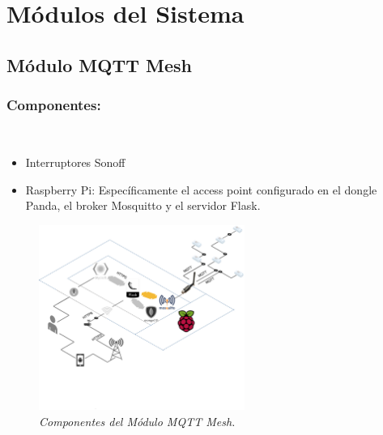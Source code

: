 \begin{itemize}

\end{itemize}


\section{Módulos del Sistema}

\subsection{Módulo MQTT Mesh}

\subsubsection{Componentes:} ~

\begin{itemize}

\item Interruptores Sonoff

\item Raspberry Pi: Específicamente el access point configurado en el dongle Panda, el broker Mosquitto y el servidor Flask.

\end{itemize}

\begin{figure}[h]
  \centering
  \includegraphics[width=0.6\textwidth, keepaspectratio]{images/mod-MQTT}
  \caption{\textit{Componentes del Módulo MQTT Mesh.}}
  \label{fig:mod-mqtt-comp}
\end{figure}

